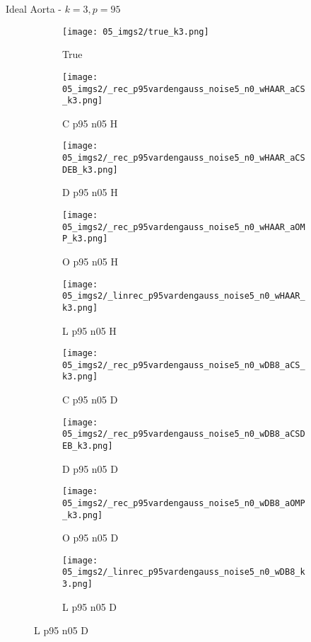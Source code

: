\begin{frame}{Ideal Aorta - $k=3,p=95$}{}
\begin{figure}
\begin{subfigure}{0.1\textwidth}
\texttt{[image: 05\_imgs2/true\_k3.png]}
\caption*{\Tiny True}
\end{subfigure}
\begin{subfigure}{0.1\textwidth}
\texttt{[image: 05\_imgs2/\_rec\_p95vardengauss\_noise5\_n0\_wHAAR\_aCS\_k3.png]}
\caption*{\Tiny C p95 n05 H}
\end{subfigure}
\begin{subfigure}{0.1\textwidth}
\texttt{[image: 05\_imgs2/\_rec\_p95vardengauss\_noise5\_n0\_wHAAR\_aCSDEB\_k3.png]}
\caption*{\Tiny D p95 n05 H}
\end{subfigure}
\begin{subfigure}{0.1\textwidth}
\texttt{[image: 05\_imgs2/\_rec\_p95vardengauss\_noise5\_n0\_wHAAR\_aOMP\_k3.png]}
\caption*{\Tiny O p95 n05 H}
\end{subfigure}
\begin{subfigure}{0.1\textwidth}
\texttt{[image: 05\_imgs2/\_linrec\_p95vardengauss\_noise5\_n0\_wHAAR\_k3.png]}
\caption*{\Tiny L p95 n05 H}
\end{subfigure}
\begin{subfigure}{0.1\textwidth}
\texttt{[image: 05\_imgs2/\_rec\_p95vardengauss\_noise5\_n0\_wDB8\_aCS\_k3.png]}
\caption*{\Tiny C p95 n05 D}
\end{subfigure}
\begin{subfigure}{0.1\textwidth}
\texttt{[image: 05\_imgs2/\_rec\_p95vardengauss\_noise5\_n0\_wDB8\_aCSDEB\_k3.png]}
\caption*{\Tiny D p95 n05 D}
\end{subfigure}
\begin{subfigure}{0.1\textwidth}
\texttt{[image: 05\_imgs2/\_rec\_p95vardengauss\_noise5\_n0\_wDB8\_aOMP\_k3.png]}
\caption*{\Tiny O p95 n05 D}
\end{subfigure}
\begin{subfigure}{0.1\textwidth}
\texttt{[image: 05\_imgs2/\_linrec\_p95vardengauss\_noise5\_n0\_wDB8\_k3.png]}
\caption*{\Tiny L p95 n05 D}
\end{subfigure}

\vspace{5pt}


\end{figure}
\end{frame}
